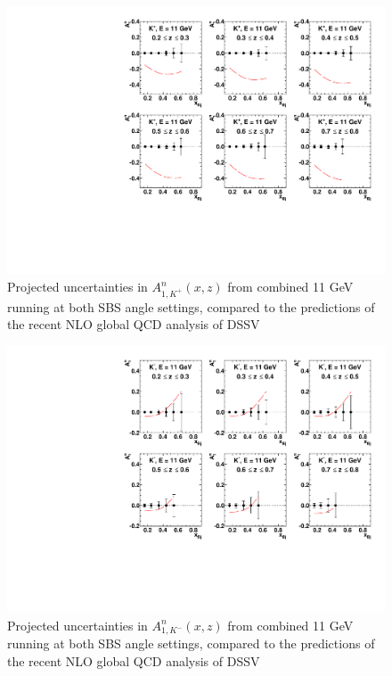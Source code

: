 \begin{figure}[h]
  \begin{center}
    \includegraphics[width=.75\textwidth]{figures/A1n_vs_x_E11_kp.pdf}
  \end{center}
  \caption{\label{A1n_kp_11gev} Projected uncertainties in $A_{1,K^+}^{n}(x,z)$ from combined 11 GeV running at both SBS angle settings, compared to the predictions of the recent NLO global QCD analysis of DSSV~\cite{DSSVplus}}
\end{figure}

\begin{figure}[h]
  \begin{center}
    \includegraphics[width=.75\textwidth]{figures/A1n_vs_x_E11_km.pdf}
  \end{center}
  \caption{\label{A1n_km_11gev} Projected uncertainties in $A_{1,K^-}^{n}(x,z)$ from combined 11 GeV running at both SBS angle settings, compared to the predictions of the recent NLO global QCD analysis of DSSV~\cite{DSSVplus}}
\end{figure}

